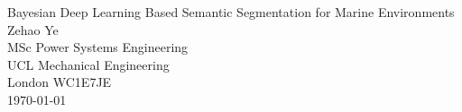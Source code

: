 \documentclass[11pt,a4paper]{article}
\begin{document}


\newpage
\setcounter{page}{1}
\thispagestyle{firstpage}

\begin{center}
    \vspace*{-20mm}
    \huge Bayesian Deep Learning Based Semantic Segmentation for Marine Environments\\
    \vspace{5mm}
    \large Zehao Ye  \\
    \large MSc Power Systems Engineering  \\
    \large UCL Mechanical Engineering  \\
    \large London WC1E7JE  \\
    \vspace{3 mm}
    \large \today
\end{center}









\newpage



\end{document}

